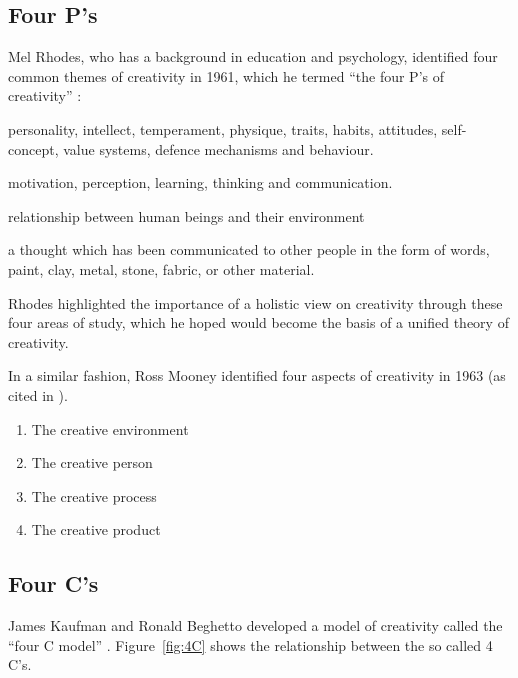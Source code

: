 \subsection{Four P's}
\label{s:fourp}

Mel Rhodes, who has a background in education and psychology, identified four common themes of creativity in 1961, which he termed ``the four P\rq s of creativity'' \citeyear{Rhodes1961}:

\begin{description}[leftmargin=2.5cm]
  \item [Persons] personality, intellect, temperament, physique, traits, habits, attitudes, self-concept, value systems, defence mechanisms and behaviour.
  \item [Process] motivation, perception, learning, thinking and communication.
  \item [Press] relationship between human beings and their environment
  \item [Products] a thought which has been communicated to other people in the form of words, paint, clay, metal, stone, fabric, or other material.
\end{description}

Rhodes highlighted the importance of a holistic view on creativity through these four areas of study, which he hoped would become the basis of a unified theory of creativity.

In a similar fashion, Ross Mooney identified four aspects of creativity in 1963 (as cited in \autocite{Sternberg1999}).

\begin{enumerate}
  \item The creative environment
  \item The creative person
  \item The creative process
  \item The creative product
\end{enumerate}


\subsection{Four C's}
\label{s:fourc}

James Kaufman and Ronald Beghetto developed a model of creativity called the ``four C model'' \citeyear{Kaufman2009}. Figure~\ref{fig:4C} shows the relationship between the so called 4 C's.

